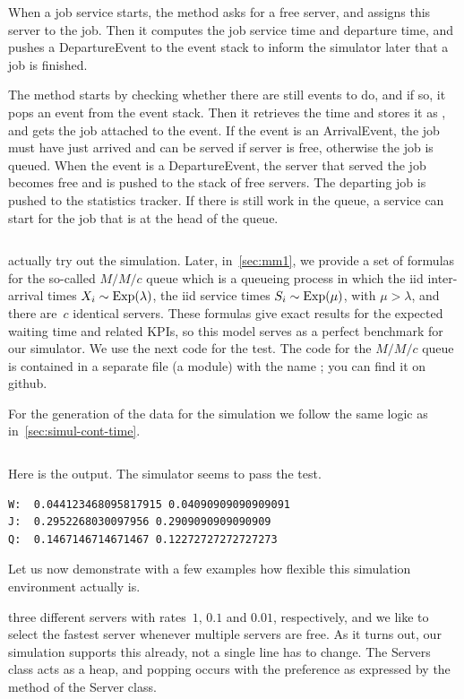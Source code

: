 \documentclass[queueing-book.tex]{subfiles}
\begin{document}
When a job service starts, the  method asks for a free server, and assigns this server to the job.
Then it computes the job service time and departure time, and pushes a DepartureEvent to the event stack to inform the simulator later that a job is finished.

The  method starts by checking whether there are still events to do, and if so, it pops an event from the event stack.
Then it retrieves the time and stores it as , and gets the job attached to the event.
If the event is an ArrivalEvent, the job must have just arrived and can be served if server is free, otherwise the job is queued.
When the event is a DepartureEvent, the server that served the job becomes free and is pushed to the stack of free servers.
The departing job is pushed to the statistics tracker.
If there is still work in the queue, a service can start for the job that is at the head of the queue.

\inputminted[label=simulator.py]{python}{../code/event_stacks/simulator.py}

 actually try out the simulation.
Later, in~\cref{sec:mm1}, we provide a set of formulas for the so-called $M/M/c$ queue which is a queueing process in which the iid inter-arrival times $X_i\sim\mathrm{Exp}(\lambda)$, the iid service times $S_{i}\sim\mathrm{Exp}(\mu)$, with $\mu > \lambda$, and there are~$c$ identical servers.
These formulas give exact results for the expected waiting time and related KPIs, so this model serves as a perfect benchmark for our simulator.
We use the next code for the test.
The code for the $M/M/c$ queue is contained in a separate file (a module) with the name ; you can find it on github.

For the generation of the data for the simulation we follow the same logic as in~\cref{sec:simul-cont-time}.
\inputminted[label=test-mmc.py]{python}{../code/event_stacks/test_mmc.py}

Here is the output. The simulator seems to pass the test.
\begin{verbatim}
W:  0.044123468095817915 0.04090909090909091
J:  0.2952268030097956 0.2909090909090909
Q:  0.1467146714671467 0.12272727272727273
\end{verbatim}

Let us now demonstrate with a few examples how flexible this simulation environment actually is.


 three different servers with rates~$1$, $0.1$ and $0.01$, respectively, and we like to select the fastest server whenever multiple servers are free.
As it turns out, our simulation supports this already, not a single line has to change. The Servers class acts as a heap, and popping occurs with the preference as expressed by the  method of the Server class.
\end{document}
